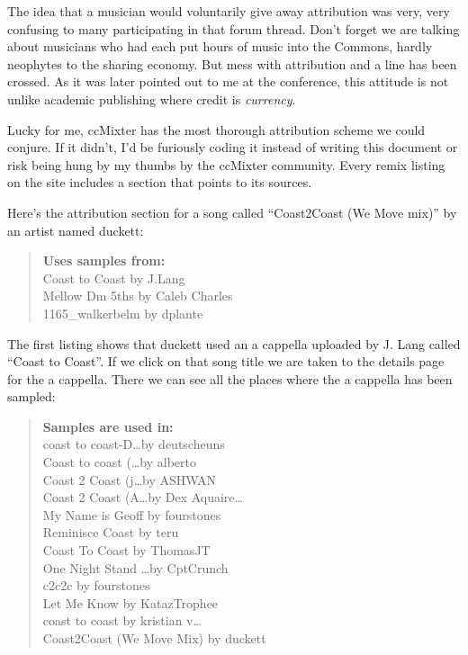 The idea that a musician would voluntarily give away attribution was very, very
confusing to many participating in that forum thread. Don't forget we are
talking about musicians who had each put hours of music into the Commons, hardly
neophytes to the sharing economy. But mess with attribution and a line has been
crossed. As it was later pointed out to me at the conference, this attitude is
not unlike academic publishing where credit is \textit{currency}.

Lucky for me, ccMixter has the most thorough attribution scheme we could
conjure. If it didn't, I'd be furiously coding it instead of writing this
document or risk being hung by my thumbs by the ccMixter community. Every remix
listing on the site includes a section that points to its sources.

Here's the attribution section for a song called ``Coast2Coast (We Move mix)''
by an artist named duckett:

\begin{quotation}
\textbf{Uses samples from:}\\
Coast to Coast by J.Lang\\
Mellow Dm 5ths by Caleb Charles\\
1165\_walkerbelm by dplante\\
\end{quotation}

The f\hbox{}irst listing shows that duckett used an a cappella uploaded by J.
Lang called ``Coast to Coast''. If we click on that  song title we are taken to
the details page for the a cappella. There we can see all the places
where the a cappella has been sampled:

\begin{quotation}
\textbf{Samples are used in:}\\
coast to coast-D\ldots by deutscheuns\\
Coast to coast (\ldots by alberto\\
Coast 2 Coast (j\ldots by ASHWAN\\
Coast 2 Coast (A\ldots by Dex Aquaire\ldots\\
My Name is Geof\hbox{}f by fourstones\\
Reminisce Coast by teru\\
Coast To Coast by ThomasJT\\
One Night Stand \ldots by CptCrunch\\
c2c2c by fourstones\\
Let Me Know by KatazTrophee\\
coast to coast by kristian v\ldots\\
Coast2Coast (We Move Mix) by duckett\\
\end{quotation}

